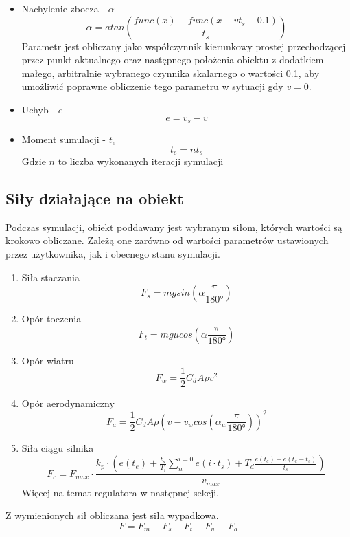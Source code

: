 \documentclass[12pt,a4paper]{article}
\begin{document}
	\begin{itemize}
		\item Nachylenie zbocza - $\alpha$ \\
		\[
		\alpha = atan \left( \frac{func(x) - func(x - vt_s - 0.1)}{t_s} \right)
		\]
		Parametr jest obliczany jako współczynnik kierunkowy prostej przechodzącej przez punkt aktualnego oraz następnego położenia obiektu z dodatkiem małego, arbitralnie wybranego czynnika skalarnego o wartości 0.1, aby umożliwić poprawne obliczenie tego parametru w sytuacji gdy $v = 0$.
		\item Uchyb - $e$
		\[
			e = v_s - v
		\]
		\item Moment sumulacji - $t_e$
		\[
			t_e = n t_s
		\]
		Gdzie $n$ to liczba wykonanych iteracji symulacji
	\end{itemize}
	
	\subsection{Siły działające na obiekt}
	Podczas symulacji, obiekt poddawany jest wybranym siłom, których wartości są krokowo obliczane. Zależą one zarówno od wartości parametrów ustawionych przez użytkownika, jak i obecnego stanu symulacji.
	\begin{enumerate}
		\item Siła staczania
		\[
			F_s = mgsin\left(\alpha\frac{\pi}{180°}\right)
		\]
		\item Opór toczenia
		\[
			F_t = mg\mu cos\left(\alpha\frac{\pi}{180°}\right)
		\]
		\item Opór wiatru
		\[
			F_w = \frac{1}{2} C_d A \rho v^2
		\]
		\item Opór aerodynamiczny
		\[
			F_a = \frac{1}{2} C_d A \rho (v - v_wcos(\alpha_w\frac{\pi}{180°}))^2
		\]
		\item Siła ciągu silnika
		\[
			F_c = F_{max} \cdot \frac{k_p \cdot \left(e(t_e) + \frac{t_s}{T_i}\sum_{n}^{i=0}e(i \cdot t_s) + T_d \frac{e(t_e) - e(t_e - t_s)}{t_s}\right)}{v_{max}}
		\]
		Więcej na temat regulatora w następnej sekcji.
	\end{enumerate}
	Z wymienionych sił obliczana jest siła wypadkowa.
	\[
		F = F_m - F_s - F_t - F_w - F_a
	\]
\end{document}
